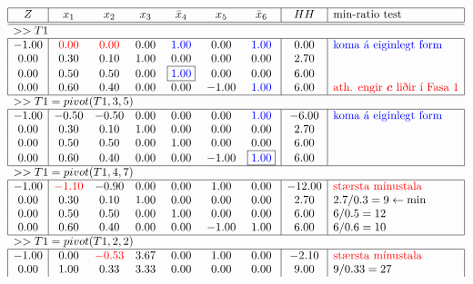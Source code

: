\begin{lausn}
\begin{center}
\begin{table}[t!]
{\renewcommand{\arraystretch}{1.5} \renewcommand{\tabcolsep}{0.2cm}
{\scriptsize
$$\begin{array}{|c|cccccc|c|l|} \hline 
 Z &  x_1 &  x_2 &   x_3 & \bar{x}_4 & x_5 &  \bar{x}_6 &  HH   & \textrm{min-ratio test}\\ 
\hline\hline \multicolumn{8}{l}{>> T1 } \\ \hline
-1.00 & \color{red}{0.00} & \color{red}{0.00} & 0.00 & \color{blue}{1.00} & 0.00 & \color{blue}{1.00} & 0.00 & \color{blue}{\textrm{koma á eiginlegt form}}\\
0.00 & 0.30 & 0.10 & 1.00 & 0.00 & 0.00 & 0.00 & 2.70 & \\
0.00 & 0.50 & 0.50 & 0.00 & \fbox{\color{blue}{1.00}} & 0.00 & 0.00 & 6.00 &\\
0.00 & 0.60 & 0.40 & 0.00 & 0.00 & -1.00 & \color{blue}{1.00} & 6.00 & \color{red}{\textrm{ath. engir $\vec{c}$ liðir í Fasa 1}}\\
\hline \multicolumn{8}{l}{>> T1=pivot(T1,3,5) } \\ \hline
-1.00 & -0.50 & -0.50 & 0.00 & 0.00 & 0.00 & \color{blue}{1.00} & -6.00 & \color{blue}{\textrm{koma á eiginlegt form}}\\
0.00 & 0.30 & 0.10 & 1.00 & 0.00 & 0.00 & 0.00 & 2.70 & \\
0.00 & 0.50 & 0.50 & 0.00 & 1.00 & 0.00 & 0.00 & 6.00 & \\
0.00 & 0.60 & 0.40 & 0.00 & 0.00 & -1.00 & \fbox{\color{blue}{1.00}} & 6.00 & \\
\hline \multicolumn{8}{l}{>> T1=pivot(T1,4,7) } \\ \hline
-1.00 & \color{red}{-1.10} & -0.90 & 0.00 & 0.00 & 1.00 & 0.00 & -12.00 & \color{red}{\textrm{stærsta mínustala}}\\
0.00 & 0.30 & 0.10 & 1.00 & 0.00 & 0.00 & 0.00 & 2.70 & 2.7/0.3=9\leftarrow \min \\
0.00 & 0.50 & 0.50 & 0.00 & 1.00 & 0.00 & 0.00 & 6.00 & 6/0.5=12\\
0.00 & 0.60 & 0.40 & 0.00 & 0.00 & -1.00 & 1.00 & 6.00 & 6/0.6=10\\
\hline \multicolumn{8}{l}{>> T1=pivot(T1,2,2) } \\ \hline
-1.00 & 0.00 & \color{red}{-0.53} & 3.67 & 0.00 & 1.00 & 0.00 & -2.10 & \color{red}{\textrm{stærsta mínustala}}\\
0.00 & 1.00 & 0.33 & 3.33 & 0.00 & 0.00 & 0.00 & 9.00 & 9/0.33=27\\

\end{array}$$}}
\end{table}
\end{center}
\end{lausn}
